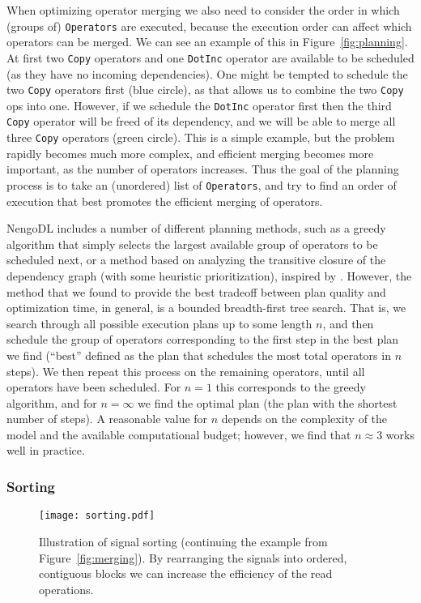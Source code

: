 \documentclass{article}
\begin{document}
When optimizing operator merging we also need to consider the order in which (groups of) \texttt{Operators} are executed, because the execution order can affect which operators can be merged.  We can see an example of this in Figure~\ref{fig:planning}.  At first two \texttt{Copy} operators and one \texttt{DotInc} operator are available to be scheduled (as they have no incoming dependencies).  One might be tempted to schedule the two \texttt{Copy} operators first (blue circle), as that allows us to combine the two \texttt{Copy} ops into one.  However, if we schedule the \texttt{DotInc} operator first then the third \texttt{Copy} operator will be freed of its dependency, and we will be able to merge all three \texttt{Copy} operators (green circle).  This is a simple example, but the problem rapidly becomes much more complex, and efficient merging becomes more important, as the number of operators increases.  Thus the goal of the planning process is to take an (unordered) list of \texttt{Operators}, and try to find an order of execution that best promotes the efficient merging of operators.

NengoDL includes a number of different planning methods, such as a greedy algorithm that simply selects the largest available group of operators to be scheduled next, or a method based on analyzing the transitive closure of the dependency graph (with some heuristic prioritization), inspired by \citet{Gosmann2017}.  However, the method that we found to provide the best tradeoff between plan quality and optimization time, in general, is a bounded breadth-first tree search.  That is, we search through all possible execution plans up to some length $n$, and then schedule the group of operators corresponding to the first step in the best plan we find (``best'' defined as the plan that schedules the most total operators in $n$ steps).  We then repeat this process on the remaining operators, until all operators have been scheduled.  For $n=1$ this corresponds to the greedy algorithm, and for $n=\infty$ we find the optimal plan (the plan with the shortest number of steps).  A reasonable value for $n$ depends on the complexity of the model and the available computational budget; however, we find that $n \approx 3$ works well in practice.

\subsubsection{Sorting}

\begin{figure}
\centering
\texttt{[image: sorting.pdf]}
\caption{Illustration of signal sorting (continuing the example from Figure~\ref{fig:merging}).  By rearranging the signals into ordered, contiguous blocks we can increase the efficiency of the read operations.}
\label{fig:sorting}
\end{figure}
\end{document}
